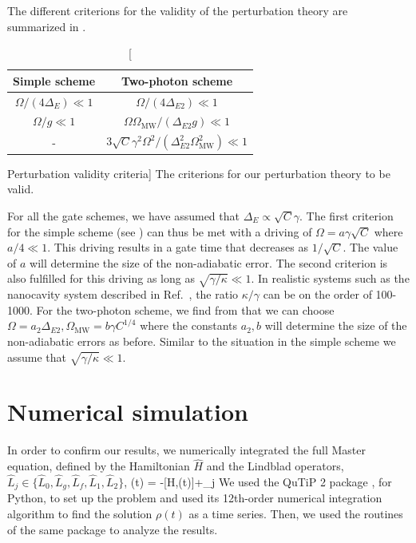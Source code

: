 The different criterions for the validity of the perturbation theory are
summarized in .
\begin{table} [H]
\centering
\begin{tabular}{|c|c|}
\hline
Simple scheme & Two-photon scheme  \\ \hline
$\Omega/(4\Delta_{E})\ll1$ & $\Omega/(4\Delta_{E2})\ll1$ \\ \hline
$\Omega/g\ll1$ & $\Omega\Omega_{\text{MW}}/(\Delta_{E2}g)\ll1$ \\ \hline
- & $3\sqrt{C}\gamma^{2}\Omega^{2}/(\Delta_{E2}^{2}\Omega_{\text{MW}}^{2})\ll1$  \\ \hline
\end{tabular}
\caption
[Perturbation validity criteria]
{The criterions for our perturbation theory to be valid. }
\label{tab:tableS1}
\end{table}
For all the gate schemes, we have assumed that
$\Delta_{E}\propto\sqrt{C}\gamma$. The first criterion for the simple scheme
(see ) can thus be met with a driving of
$\Omega=a\gamma\sqrt{C}$ where $a/4\ll1$. This driving results in a gate time
that decreases as $1/\sqrt{C}$. The value of $a$ will determine the size of the
non-adiabatic error. The second criterion is also fulfilled for this driving as
long as $\sqrt{\gamma/\kappa}\ll1$. In realistic systems such as the nanocavity
system described in Ref.~\cite{thompson, Tiecke}, the ratio $\kappa/\gamma$ can
be on the order of 100-1000.
For the two-photon scheme, we find from  that we can choose
$\Omega=a_{2}\Delta_{E2}, \Omega_{\text{MW}}=b\gamma C^{1/4}$ where the
constants $a_{2},b$ will determine the size of the non-adiabatic errors as
before. Similar to the situation in the simple scheme we assume that
$\sqrt{\gamma/\kappa}\ll1$.

\section{Numerical simulation}
In order to confirm our results, we numerically integrated the full Master
equation, defined by the Hamiltonian $\hat H$ and the Lindblad operators,
$\hat L_j \in \{\hat L_0, \hat L_g, \hat L_f, \hat L_1, \hat L_2\}$, 
\bel
\label{eq:full Master eq}
	\rho(t) = -[\hat H,\rho(t)]+\sum_j 
\eel
We used the QuTiP 2
package \cite{Johansson20131234}, for Python, to set up the problem and used its
12th-order numerical integration algorithm to find the solution $\rho(t)$ as a
time series.
Then, we used the routines of the same package to analyze the results. 

